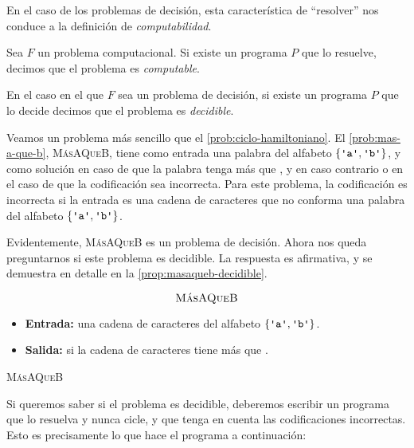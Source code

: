 En el caso de los problemas de decisión, esta característica de ``resolver'' nos conduce a la definición de \emph{computabilidad}.

\begin{definicion}\label{def:decidible}
Sea $F$ un problema computacional. Si existe un programa $P$ que lo resuelve, decimos que el problema es \emph{computable}.

En el caso en el que $F$ sea un problema de decisión, si existe un programa $P$ que lo decide decimos que el problema es \emph{decidible}.
\end{definicion}

Veamos un problema más sencillo que el \cref{prob:ciclo-hamiltoniano}. El \cref{prob:mas-a-que-b}, \textsc{MásAQueB}, tiene como entrada una palabra del alfabeto $\{\palabra{a}, \palabra{b}\}$, y como solución  en caso de que la palabra tenga más  que , y  en caso contrario o en el caso de que la codificación sea incorrecta. Para este problema, la codificación es incorrecta si la entrada es una cadena de caracteres que no conforma una palabra del alfabeto $\{\palabra{a}, \palabra{b}\}$.

Evidentemente, \textsc{MásAQueB} es un problema de decisión. Ahora nos queda preguntarnos si este problema es decidible. La respuesta es afirmativa, y se demuestra en detalle en la \cref{prop:masaqueb-decidible}.

\begin{problema}
\begin{framed}
$$\text{\textsc{MásAQueB}}$$

\begin{itemize}
    \item \textbf{Entrada:} una cadena de caracteres del alfabeto $\{\palabra{a}, \palabra{b}\}$.
    \item \textbf{Salida:} si la cadena de caracteres tiene más  que .
\end{itemize}
\end{framed}
\caption{\textsc{MásAQueB}}
\label{prob:mas-a-que-b}
\end{problema}

Si queremos saber si el problema es decidible, deberemos escribir un programa que lo resuelva y nunca cicle, y que tenga en cuenta las codificaciones incorrectas. Esto es precisamente lo que hace el programa a continuación:


